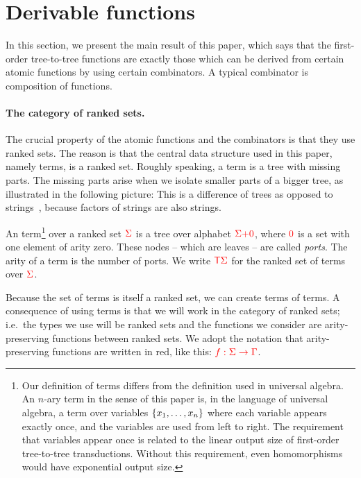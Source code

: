 \section{Derivable functions}
In this section, we present the main result of this paper, which says that the  first-order tree-to-tree functions are exactly those which can be derived from certain atomic functions by using certain combinators.  A typical combinator is composition of functions.

\paragraph*{The category of ranked sets.}
The crucial property of the atomic functions and  the combinators is that they use ranked sets. The reason is that the central data structure used in this paper, namely terms, is a ranked set.  Roughly speaking, a term is a tree with missing parts. The missing parts arise when we  isolate smaller parts of a bigger tree, as illustrated in the following picture:
This is a difference of trees as opposed to strings~\cite{bojanczykRegularFirstOrderList2018}, because factors of strings are also strings.


\begin{definition}[Terms]\label{def:terms}
    An  term\footnote{
        Our definition of terms differs from the definition used in universal algebra. An $n$-ary term in the sense of this paper is, in the language of universal algebra, a term over variables $\{x_1,\ldots,x_n\}$ where each variable appears exactly once, and the variables are used from left to right.  The requirement that variables appear  once is related to the linear output size of first-order tree-to-tree transductions. Without this requirement, even homomorphisms would have exponential output size. 
    } over a ranked set ${\color{red}{\Sigma}}$ is a tree over alphabet ${\color{red}{\Sigma}} {\color{red}{+}} {{\color{red}{0}}}$, where ${{\color{red}{0}}}$ is a set with one element of arity zero.  These nodes -- which are leaves --  are called \emph{ports}. The arity of a term is the number of ports.  We write ${\color{red}{\mathsf T}} {\color{red}{\Sigma}}$ for the ranked set of terms over ${\color{red}{\Sigma}}$.  
\end{definition}



Because the set of terms is itself a ranked set,  we can create terms of terms.         A consequence of using terms is that we will work in the category of ranked sets; i.e.~the types we use will be ranked sets and the functions we consider are arity-preserving functions between ranked sets. We adopt the notation that arity-preserving functions are written in red, like this: ${\color{red}{f : \Sigma \to \Gamma}}$. 


